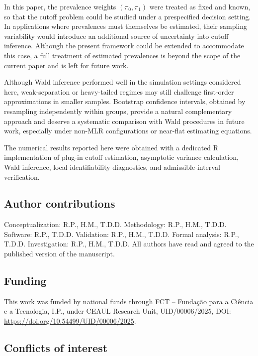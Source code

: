 \documentclass[11pt,a4paper]{article}
\theoremstyle{definition}
\theoremstyle{remark}
\newcommand{\1}{\mathbf{1}}
\begin{document}
In this paper, the prevalence weights $(\pi_0,\pi_1)$ were treated as fixed and known, so that the cutoff problem could be studied under a prespecified decision setting. In applications where prevalences must themselves be
estimated, their sampling variability would introduce an additional source of uncertainty into cutoff inference. Although the present framework could be extended to accommodate this case, a full treatment of estimated prevalences is beyond the scope of the current paper and is left for future work.

Although Wald inference performed well in the simulation settings considered here, weak-separation or heavy-tailed regimes may still challenge first-order approximations in smaller samples. Bootstrap confidence intervals, obtained by resampling independently within groups, provide a natural complementary approach and deserve a systematic comparison with Wald procedures in future work, especially under non-MLR configurations or near-flat estimating equations.

The numerical results reported here were obtained with a dedicated \textsf{R} implementation of plug-in cutoff estimation, asymptotic variance calculation, Wald inference, local identifiability diagnostics, and admissible-interval verification.


\subsection*{Author contributions}

Conceptualization: R.P., H.M., T.D.D. Methodology: R.P., H.M., T.D.D.
Software: R.P., T.D.D. Validation: R.P., H.M., T.D.D. Formal
analysis: R.P., T.D.D. Investigation: R.P., H.M., T.D.D. All authors
have read and agreed to the published version of the manuscript.

\subsection*{Funding}

This work was funded by national funds through FCT -- Fundação para a
Ciência e a Tecnologia, I.P., under CEAUL Research Unit,
UID/00006/2025, DOI:
\url{https://doi.org/10.54499/UID/00006/2025}.

\subsection*{Conflicts of interest}
\end{document}
